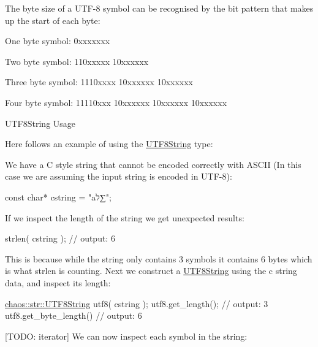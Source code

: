 The byte size of a U\+T\+F-\/8 symbol can be recognised by the bit pattern that makes up the start of each byte\+:


\begin{DoxyItemize}
\item One byte symbol\+: {\ttfamily 0xxxxxxx}
\item Two byte symbol\+: {\ttfamily 110xxxxx 10xxxxxx}
\item Three byte symbol\+: {\ttfamily 1110xxxx 10xxxxxx 10xxxxxx}
\item Four byte symbol\+: {\ttfamily 11110xxx 10xxxxxx 10xxxxxx 10xxxxxx}
\end{DoxyItemize}

\begin{DoxyParagraph}{U\+T\+F8\+String Usage}

\end{DoxyParagraph}
Here follows an example of using the \hyperlink{classchaos_1_1str_1_1_u_t_f8_string}{U\+T\+F8\+String} type\+:

We have a C style string that cannot be encoded correctly with A\+S\+C\+I\+I (In this case we are assuming the input string is encoded in U\+T\+F-\/8)\+:


\begin{DoxyCode}
\textcolor{keyword}{const} \textcolor{keywordtype}{char}* cstring = \textcolor{stringliteral}{"aל∑"};
\end{DoxyCode}


If we inspect the length of the string we get unexpected results\+:


\begin{DoxyCode}
strlen( cstring );
\textcolor{comment}{// output: 6}
\end{DoxyCode}


This is because while the string only contains 3 symbols it contains 6 bytes which is what {\ttfamily strlen} is counting. Next we construct a \hyperlink{classchaos_1_1str_1_1_u_t_f8_string}{U\+T\+F8\+String} using the c string data, and inspect it\textquotesingle{}s length\+:


\begin{DoxyCode}
\hyperlink{classchaos_1_1str_1_1_u_t_f8_string}{chaos::str::UTF8String} utf8( cstring );
utf8.get\_length();
\textcolor{comment}{// output: 3}
utf8.get\_byte\_length()
\textcolor{comment}{// output: 6}
\end{DoxyCode}


\mbox{[}T\+O\+D\+O\+: iterator\mbox{]} We can now inspect each symbol in the string\+:


